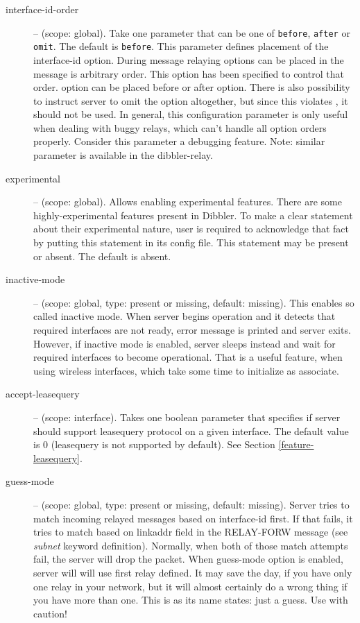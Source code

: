 \begin{description}
\item[interface-id-order] -- (scope: global). Take one parameter that
  can be one of \verb+before+, \verb+after+ or \verb+omit+. The
        default is \verb+before+. This parameter defines placement of
        the interface-id option. During message relaying options can
        be placed in the  message is arbitrary
        order. This option has been specified to control that
        order.  option can be placed before or
        after  option. There is also possibility to
        instruct server to omit the  option
        altogether, but since this violates \cite{rfc3315}, it should
        not be used. In general, this configuration parameter is only
        useful when dealing with buggy relays, which can't handle all
        option orders properly. Consider this parameter a debugging
        feature. Note: similar parameter is available in the
        dibbler-relay.

\item[experimental] -- (scope: global). Allows enabling experimental
features. There are some highly-experimental features present in
Dibbler. To make a clear statement about their experimental nature,
user is required to acknowledge that fact by putting this statement in
its config file. This statement may be present or absent. The default
is absent.

\item[inactive-mode] -- (scope: global, type: present or missing,
  default: missing). This enables so called inactive mode. When server
  begins operation and it detects that required interfaces are not
  ready, error message is printed and server exits. However, if
  inactive mode is enabled, server sleeps instead and wait for
  required interfaces to become operational. That is a useful feature,
  when using wireless interfaces, which take some time to initialize
  as associate.

\item[accept-leasequery] -- (scope: interface). Takes one boolean
  parameter that specifies if server should support leasequery
  \cite{rfc5007} protocol on a given interface. The default value is
  0 (leasequery is not supported by default). See Section
  \ref{feature-leasequery}.


\item[guess-mode] -- (scope: global, type: present or missing,
  default: missing). Server tries to match incoming relayed messages
  based on interface-id first. If that fails, it tries to match based
  on linkaddr field in the RELAY-FORW message (see \emph{subnet}
  keyword definition). Normally, when both of those match attempts
  fail, the server will drop the packet. When guess-mode option is
  enabled, server will will use first relay defined. It may save the
  day, if you have only one relay in your network, but it will almost
  certainly do a wrong thing if you have more than one. This is as
  its name states: just a guess. Use with caution!


\end{description}
